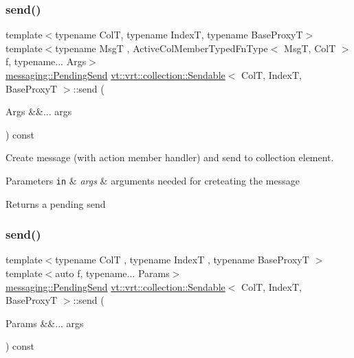 \mbox{\label{structvt_1_1vrt_1_1collection_1_1_sendable_a65e5494a18b398b52f12c056cff1dc16}} 
\subsubsection{\texorpdfstring{send()}{send()}\hspace{0.1cm}{\footnotesize\ttfamily [6/7]}}
{\footnotesize\ttfamily template$<$typename ColT, typename IndexT, typename Base\+ProxyT$>$ \\
template$<$typename MsgT , Active\+Col\+Member\+Typed\+Fn\+Type$<$ Msg\+T, Col\+T $>$ f, typename... Args$>$ \\
\hyperlink{structvt_1_1messaging_1_1_pending_send}{messaging\+::\+Pending\+Send} \hyperlink{structvt_1_1vrt_1_1collection_1_1_sendable}{vt\+::vrt\+::collection\+::\+Sendable}$<$ ColT, IndexT, Base\+ProxyT $>$\+::send (\begin{DoxyParamCaption}\item[{Args \&\&...}]{args }\end{DoxyParamCaption}) const}



Create message (with action member handler) and send to collection element. 


\begin{DoxyParams}[1]{Parameters}
\mbox{\tt in}  & {\em args} & arguments needed for creteating the message\\
\hline
\end{DoxyParams}
\begin{DoxyReturn}{Returns}
a pending send 
\end{DoxyReturn}
\mbox{\label{structvt_1_1vrt_1_1collection_1_1_sendable_a2de5ccb7685ed0d975315944da492491}} 
\subsubsection{\texorpdfstring{send()}{send()}\hspace{0.1cm}{\footnotesize\ttfamily [7/7]}}
{\footnotesize\ttfamily template$<$typename ColT , typename IndexT , typename Base\+ProxyT $>$ \\
template$<$auto f, typename... Params$>$ \\
\hyperlink{structvt_1_1messaging_1_1_pending_send}{messaging\+::\+Pending\+Send} \hyperlink{structvt_1_1vrt_1_1collection_1_1_sendable}{vt\+::vrt\+::collection\+::\+Sendable}$<$ ColT, IndexT, Base\+ProxyT $>$\+::send (\begin{DoxyParamCaption}\item[{Params \&\&...}]{args }\end{DoxyParamCaption}) const}



